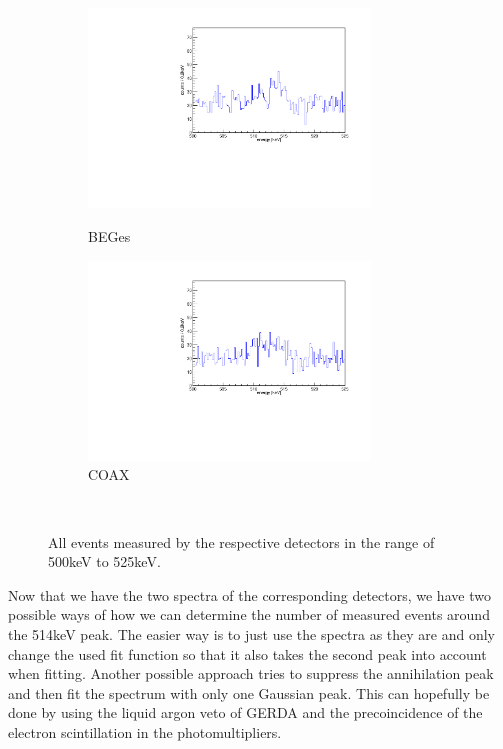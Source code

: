 \begin{figure}[t!]
\centering
\begin{subfigure}{.5\textwidth}
  \centering
	\includegraphics[width=75mm]{./Bilder/500525NoFilterBEGes.pdf}
  \label{fig:NoFilterBEGes}
  \caption{BEGes}
\end{subfigure}%
\begin{subfigure}{.5\textwidth}
  \centering
	\includegraphics[width=75mm]{./Bilder/500525NoFilterCOAX.pdf}
  \caption{COAX}
  \label{fig:NoFilterCOAX}
\end{subfigure}
    \\
	\vspace{0.5cm}
	\caption{All events measured by the respective detectors in the range of 500keV to 525keV.}
\end{figure}

Now that we have the two spectra of the corresponding detectors, we have two possible ways of how we can determine the number of measured events around the 514keV peak.
The easier way is to just use the spectra as they are and only change the used fit function so that it also takes the second peak into account when fitting.
Another possible approach tries to suppress the annihilation peak and then fit the spectrum with only one Gaussian peak.
This can hopefully be done by using the liquid argon veto of GERDA and the precoincidence of the electron scintillation in the photomultipliers. 
\\ 

